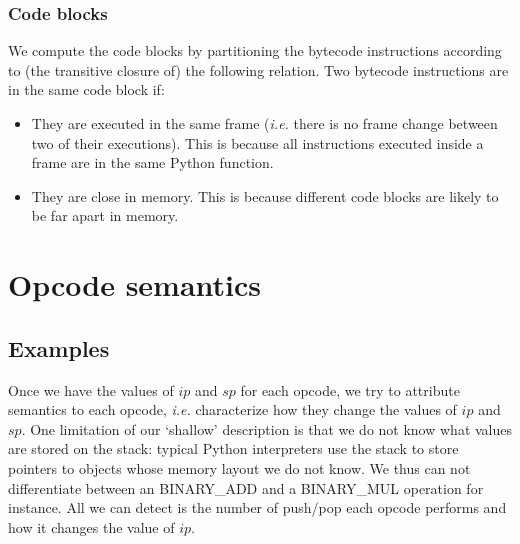 \documentclass[english]{article}
\begin{document}
\subsubsection{Code blocks}

We compute the code blocks by partitioning the bytecode instructions according to (the transitive closure of) the following relation. Two bytecode instructions are in the same code block if:
\begin{itemize}
	\item They are executed in the same frame (\textit{i.e.} there is no frame change between two of their executions). This is because all instructions executed inside a frame are in the same Python function.
	\item They are close in memory. This is because different code blocks are likely to be far apart in memory. %
\end{itemize}


\section{Opcode semantics}

\subsection{Examples}

Once we have the values of $ip$ and $sp$ for each opcode, we try to attribute semantics to each opcode, \textit{i.e.} characterize how they change the values of $ip$ and $sp$. One limitation of our `shallow' description is that we do not know what values are stored on the stack: typical Python interpreters use the stack to store pointers to objects whose memory layout we do not know. We thus can not differentiate between an BINARY\_ADD and a BINARY\_MUL operation for instance. All we can detect is the number of push/pop each opcode performs and how it changes the value of $ip$.
\end{document}
